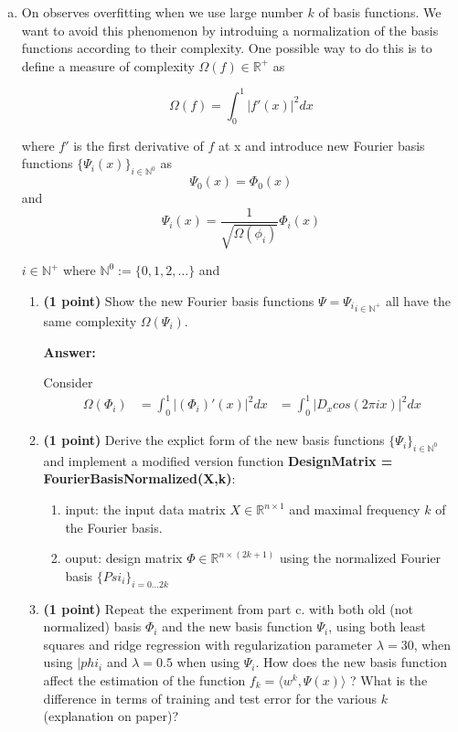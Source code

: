 \documentclass{./tufte-handout}
\begin{document}
\begin{enumerate}[(a)]
\begin{enumerate}
\end{enumerate}
\FloatBarrier
\item On observes overfitting when we use large number $k$ of basis functions. We 
want to avoid this phenomenon by introduing a normalization of the basis functions according 
to their complexity. One possible way to do this is to define a measure of complexity $\Omega(f) \in \mathbb{R}^+$ as

\begin{equation}
    \Omega(f) = \int_0^1 |f'(x)|^2  dx
\end{equation}

where $f'$ is the first derivative of $f$ at x and introduce new Fourier basis functions $\{\Psi_i(x)\}_{i \in \mathbb{N}^0}$ as
\begin{equation}
    \Psi_0(x) = \Phi_0(x) 
\end{equation} 
and 
\begin{equation}
    \Psi_i(x) = \frac{1}{\sqrt{\Omega(\phi_i)}} \Phi_i(x) 
\end{equation}

$i \in \mathbb{N}^+$ where $\mathbb{N}^0 :=\{0, 1,2, \dots \}$ and 
\begin{enumerate}
    \item \textbf{(1 point)} Show the new Fourier basis functions $\Psi = {\Psi_i}_{ i\in \mathbb{N}^+}$ all have the same 
    complexity $\Omega(\Psi_i)$. 

    \textbf{Answer:}

    Consider 
    \begin{align} 
        \Omega(\Phi_i) &= \int_0^1 |(\Phi_i)'(x)|^2 dx
        &= \int_0^1 |D_x cos(2\pi i x)|^2 dx 
    \end{align}
    
    \item \textbf{(1 point)} Derive the explict form of the new basis functions $\{\Psi_i\}_{i \in \mathbb{N}^0}$ and implement a 
    modified version function \textbf{DesignMatrix = FourierBasisNormalized(X,k)}:
    \begin{enumerate}
        \item input: the input data matrix $X \in \mathbb{R}^{n \times 1}$ and maximal frequency $k$ of the Fourier basis.
        \item ouput: design matrix  $\Phi \in \mathbb{R}^{n \times (2k+1)}$ using the normalized Fourier basis $\{Psi_i\}_{i = 0 \dots 2k}$
    \end{enumerate}
    \item \textbf{(1 point)} Repeat the experiment from part c. with both old (not normalized)  basis $\Phi_i$ and 
    the new basis function $\Psi_i$, using both least squares and ridge regression with regularization parameter $\lambda = 30$, when using 
    $|phi_i$ and $\lambda=0.5$ when using $\Psi_i$. How does the new basis function affect the 
    estimation of the function $f_k = \langle w^k, \Psi(x)\rangle$ ? What is the difference in 
    terms of training and test error for the various $k$ (explanation on paper)?
\end{enumerate}



\end{enumerate}
\end{document}
